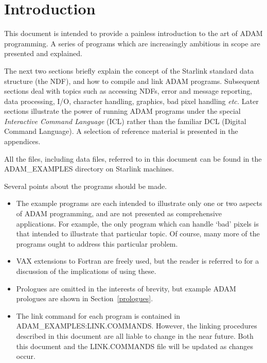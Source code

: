 \documentclass[twoside,11pt,nolof]{starlink}
\begin{document}
\scfrontmatter

\section{Introduction\label{intro}}

This document is intended to provide a painless introduction to  the art
of ADAM programming.
A series of programs which are increasingly ambitious  in scope are
presented and  explained.

The next  two sections briefly explain the
concept of the Starlink standard data structure (the NDF), and
how to compile and link ADAM programs.
Subsequent sections deal with
topics such as accessing  NDFs, error and message reporting, data processing,
I/O, character handling, graphics,
bad pixel handling \textit{etc.}
Later sections illustrate the power of running ADAM programs under the
special {\sl Interactive Command Language} (ICL) rather than the familiar
DCL (Digital Command Language).
A selection of reference material is presented in the appendices.

All the files, including data files, referred to in this document can be
found in the ADAM\_EXAMPLES directory on Starlink machines.

Several points about the programs should be made.
\begin{itemize}
\item The example programs are each intended to illustrate
only one or two aspects of ADAM programming, and are not presented as
comprehensive applications.
For example, the only program which can handle `bad' pixels is that intended
to illustrate that particular topic. Of course, many more of the programs
ought to address this particular problem.

\item VAX extensions to Fortran are freely used, but the reader is referred to
 for a discussion of the implications of using these.

\item Prologues are omitted in the interests of brevity, but example ADAM
prologues are shown in Section~\ref{prologues}.

\item The link command for each program is contained in
ADAM\_EXAMPLES:LINK.COMMANDS. However, the linking procedures described in this
document are all liable to change in the near future. Both this document and
the LINK.COMMANDS file will be updated as changes occur.

\end{itemize}
\end{document}

